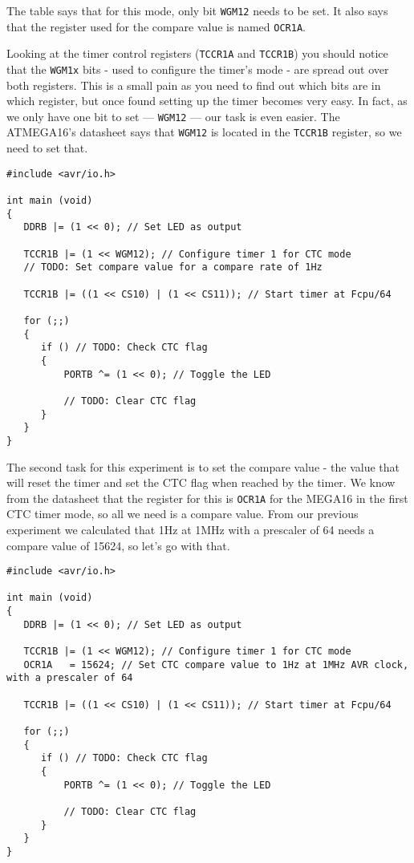 \documentclass[a4paper,oneside,notitlepage]{book}
\begin{document}
The table says that for this mode, only bit \texttt{WGM12} needs to be set. It also says that the register used for the compare value is named \texttt{OCR1A}.

Looking at the timer control registers (\texttt{TCCR1A} and \texttt{TCCR1B}) you should notice that the \texttt{WGM1x} bits - used to configure the timer's mode - are spread out over both registers. This is a small pain as you need to find out which bits are in which register, but once found setting up the timer becomes very easy. In fact, as we only have one bit to set --- \texttt{WGM12} --- our task is even easier. The ATMEGA16's datasheet says that \texttt{WGM12} is located in the \texttt{TCCR1B} register, so we need to set that.

\begin{center}
\begin{lstlisting}
#include <avr/io.h>

int main (void)
{
   DDRB |= (1 << 0); // Set LED as output

   TCCR1B |= (1 << WGM12); // Configure timer 1 for CTC mode
   // TODO: Set compare value for a compare rate of 1Hz

   TCCR1B |= ((1 << CS10) | (1 << CS11)); // Start timer at Fcpu/64

   for (;;)
   {
      if () // TODO: Check CTC flag
      {
          PORTB ^= (1 << 0); // Toggle the LED

          // TODO: Clear CTC flag
      }
   }
}
\end{lstlisting}
\end{center}

The second task for this experiment is to set the compare value - the value that will reset the timer and set the CTC flag when reached by the timer. We know from the datasheet that the register for this is \texttt{OCR1A} for the MEGA16 in the first CTC timer mode, so all we need is a compare value. From our previous experiment we calculated that 1Hz at 1MHz with a prescaler of 64 needs a compare value of 15624, so let's go with that.

\begin{center}
\begin{lstlisting}
#include <avr/io.h>

int main (void)
{
   DDRB |= (1 << 0); // Set LED as output

   TCCR1B |= (1 << WGM12); // Configure timer 1 for CTC mode
   OCR1A   = 15624; // Set CTC compare value to 1Hz at 1MHz AVR clock, with a prescaler of 64

   TCCR1B |= ((1 << CS10) | (1 << CS11)); // Start timer at Fcpu/64

   for (;;)
   {
      if () // TODO: Check CTC flag
      {
          PORTB ^= (1 << 0); // Toggle the LED

          // TODO: Clear CTC flag
      }
   }
}
\end{lstlisting}
\end{center}
\end{document}
